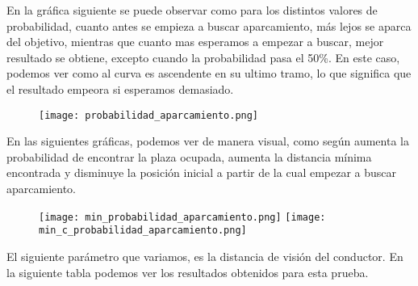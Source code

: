 En la gráfica siguiente se puede observar como para los distintos valores de probabilidad, cuanto antes se empieza a buscar aparcamiento, más lejos se aparca del objetivo, mientras que cuanto mas esperamos a empezar a buscar, mejor resultado se obtiene, excepto cuando la probabilidad pasa el 50\%. En este caso, podemos ver como al curva es ascendente en su ultimo tramo, lo que significa que el resultado empeora si esperamos demasiado.

\begin{figure}[h]
\texttt{[image: probabilidad\_aparcamiento.png]}
\centering
\end{figure}

\newpage
En las siguientes gráficas, podemos ver de manera visual, como según aumenta la probabilidad de encontrar la plaza ocupada, aumenta la distancia mínima encontrada y disminuye la posición inicial a partir de la cual empezar a buscar aparcamiento.
\begin{figure}[h]
\texttt{[image: min\_probabilidad\_aparcamiento.png]}
\texttt{[image: min\_c\_probabilidad\_aparcamiento.png]}
\centering
\end{figure}

\newpage

El siguiente parámetro que variamos, es la distancia de visión del conductor. En la siguiente tabla podemos ver los resultados obtenidos para esta prueba.

\begin{table}[h]
\centering
{}
\end{table}

